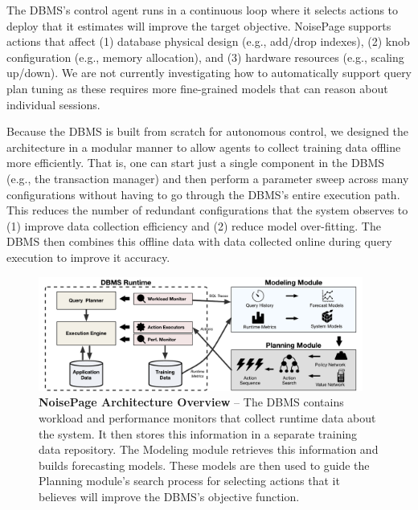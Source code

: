 \documentclass[11pt,times]{article}
\newcommand{\noisepage}{NoisePage\xspace}
\begin{document}

The DBMS's control agent runs in a continuous loop where it selects actions to deploy that it 
estimates will improve the target objective. \noisepage supports actions that affect (1) database 
physical design (e.g., add/drop 
indexes), (2) knob configuration (e.g., memory allocation), and (3) hardware resources (e.g., 
scaling up/down). We are not currently investigating how to automatically support query plan tuning 
as these requires more fine-grained models that can reason about individual sessions.

Because the DBMS is built from scratch for autonomous control, we designed the architecture in a 
modular manner to allow agents to collect training data offline more efficiently. That is, one
can start just a single component in the DBMS (e.g., the transaction manager) and then perform 
a parameter sweep across many configurations without having to go through the DBMS's entire 
execution path. This reduces the number of redundant configurations that the system observes 
to (1) improve data collection efficiency and (2) reduce model over-fitting. The DBMS then 
combines this offline data with data collected online during query execution to improve it accuracy.

\begin{figure}[t!]
    \centering
    \includegraphics[width=0.95\textwidth]{figures/noisepage-overview.pdf}
    \caption{
        \textbf{\noisepage Architecture Overview} --
        The DBMS contains workload and performance monitors that collect runtime data about the 
        system. It then stores this information in a separate training data repository. The 
        Modeling module retrieves this information and builds forecasting models. These models are 
        then used to guide the Planning module's search process for selecting actions that it 
        believes will improve the DBMS's objective function.
    }
    \label{fig:noisepage-overview}
\end{figure}
\end{document}
